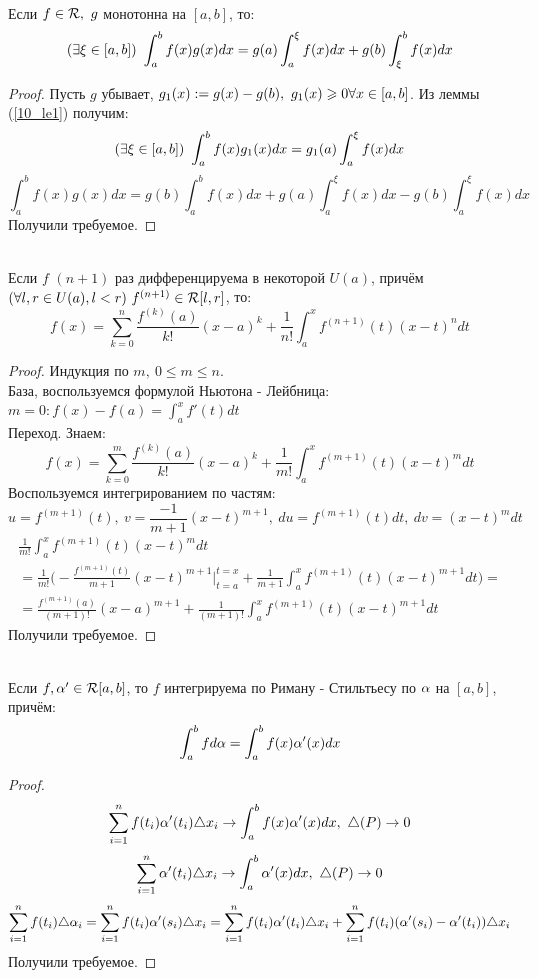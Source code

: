 \begin{theorem}\\
	Если $f\in\mathcal R,\ g$ монотонна на $[a,b]$, то:
	\[(\ex\xi\in[a,b])\ \int_a^bf(x)g(x)dx=g(a)\int_a^\xi f(x)dx+g(b)\int_\xi^bf(x)dx\]
\end{theorem}
\begin{proof}
	Пусть $g$ убывает, $g_1(x):=g(x)-g(b),\ g_1(x)\geqslant0 \forall x\in[a,b]$.
	Из леммы (\ref{10_le1}) получим:
	\[(\ex\xi\in[a,b])\ \int_a^bf(x)g_1(x)dx=g_1(a)\int_a^\xi f(x)dx\]
	\[\int_a^bf(x)g(x)dx=g(b)\int_a^bf(x)dx+g(a)\int_a^\xi f(x)dx-g(b)\int_a^\xi f(x)dx\]
	Получили требуемое.
\end{proof}
\begin{theorem}\\
	Если $f$ $(n+1)$ раз дифференцируема в некоторой $U(a)$, причём $(\fa l,r\in U(a), l<r)\ f^{(n+1)}\in\mc R[l,r]$, то:
	\[f(x)=\sum_{k=0}^n\frac{f^{(k)}(a)}{k!}(x-a)^k+\frac1{n!}\int_a^xf^{(n+1)}(t)(x-t)^ndt\]
\end{theorem}
\begin{proof}
	Индукция по $m,\ 0\le m\le n$.\\
	База, воспользуемся формулой Ньютона - Лейбница: $m=0: f(x)-f(a)=\int_a^xf'(t)dt$\\
	Переход. Знаем:
	\[f(x)=\sum_{k=0}^m\frac{f^{(k)}(a)}{k!}(x-a)^k+\frac1{m!}\int_a^xf^{(m+1)}(t)(x-t)^mdt\]
	Воспользуемся интегрированием по частям:
	\[u=f^{(m+1)}(t),\ v=\frac{-1}{m+1}(x-t)^{m+1},\ du=f^{(m+1)}(t)dt,\ dv=(x-t)^mdt\]
	\begin{multline*}
		\frac1{m!}\int_a^xf^{(m+1)}(t)(x-t)^mdt\\
		=\frac1{m!}\bigg(-\frac{f^{(m+1)}(t)}{m+1}(x-t)^{m+1}\bigg|_{t=a}^{t=x}+\frac1{m+1}\int_a^xf^{(m+1)}(t)(x-t)^{m+1}dt\bigg)=\\
		=\frac{f^{(m+1)}(a)}{(m+1)!}(x-a)^{m+1}+\frac1{(m+1)!}\int_a^xf^{(m+1)}(t)(x-t)^{m+1}dt
	\end{multline*}
	Получили требуемое.
\end{proof}
\begin{note}\\
	Если $f,\alpha'\in\mathcal R[a,b]$, то $f$ интегрируема по Риману - Стильтьесу по $\alpha$ на $[a,b]$, причём:
	\[\int_a^bfd\alpha=\int_a^bf(x)\alpha'(x)dx\]
\end{note}
\begin{proof}
	\[\sum_{i=1}^nf(t_i)\alpha'(t_i)\tr x_i\ra\int_a^bf(x)\al'(x)dx,\ \tr(P)\ra0\]
	\[\sum_{i=1}^n\al'(t_i)\tr x_i\ra\int_a^b\al'(x)dx,\ \tr(P)\ra0\]
	\[\sum_{i=1}^nf(t_i)\tr\al_i=\sum_{i=1}^nf(t_i)\al'(s_i)\tr x_i=\sum_{i=1}^nf(t_i)\al'(t_i)\tr x_i+\sum_{i=1}^nf(t_i)(\al'(s_i)-\al'(t_i))\tr x_i\]
	Получили требуемое.
\end{proof}
